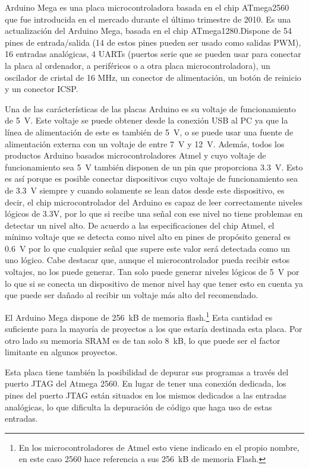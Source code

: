 
Arduino Mega es una placa microcontroladora basada en el chip ATmega2560 que fue introducida en el mercado durante el último trimestre de 2010.  
Es una actualización del Arduino Mega, basada en el chip ATmega1280.\@ Dispone de 54 pines de entrada/salida (14 de estos pines pueden ser usado como salidas PWM), 16 entradas analógicas, 4 UARTs (puertos serie que se pueden usar para conectar la placa al ordenador, a periféricos o a otra placa microcontroladora), un oscilador de cristal de 16 MHz, un conector de alimentación, un botón de reinicio y un conector ICSP.\@

Una de las carácterísticas de las placas Arduino es su voltaje de funcionamiento de 5~V. Este voltaje se puede obtener desde la conexión USB al PC ya que la línea de alimentación de este es también de 5~V, o se puede usar una fuente de alimentación externa con un voltaje de entre 7~V y 12~V. Además, todos los productos Arduino basados microcontroladores Atmel y cuyo voltaje de funcionamiento sea 5~V también disponen de un pin que proporciona 3.3~V. Esto es así porque es posible conectar dispositivos cuyo voltaje de funcionamiento sea de 3.3~V siempre y cuando solamente se lean datos desde este dispositivo, es decir, el chip microcontrolador del Arduino es capaz de leer correctamente niveles lógicos de 3.3V, por lo que si recibe una señal con ese nivel no tiene problemas en detectar un nivel alto. De acuerdo a las especificaciones del chip Atmel, el mínimo voltaje que se detecta como nivel alto en pines de propósito general es 0.6~V por lo que cualquier señal que supere este valor será detectada como un uno lógico. Cabe destacar que, aunque el microcontrolador pueda recibir estos voltajes, no los puede generar. Tan solo puede generar niveles lógicos de 5~V por lo que si se conecta un dispositivo de menor nivel hay que tener esto en cuenta ya que puede ser dañado al recibir un voltaje más alto del recomendado.

El Arduino Mega dispone de 256~kB de memoria flash.\footnote{En los microcontroladores de Atmel esto viene indicado en el propio nombre, en este caso 2560 hace referencia a sus 256~kB de memoria Flash.} Esta cantidad es suficiente para la mayoría de proyectos a los que estaría destinada esta placa. Por otro lado su memoria SRAM es de tan solo 8~kB, lo que puede ser el factor limitante en algunos proyectos.

Esta placa tiene también la posibilidad de depurar sus programas a través del puerto JTAG del Atmega 2560. En lugar de tener una conexión dedicada, los pines del puerto JTAG están situados en los mismos dedicados a las entradas analógicas, lo que dificulta la depuración de código que haga uso de estas entradas.

